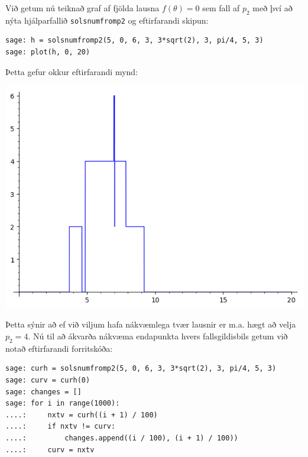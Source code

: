 \documentclass{article}
\begin{document}
\vspace*{0.5cm}

Við getum nú teiknað graf af fjölda lausna $f(\theta) = 0$ sem fall af $p_2$ með því að nýta hjálparfallið \verb|solsnumfromp2| og eftirfarandi skipun: \\

\begin{verbatim}
sage: h = solsnumfromp2(5, 0, 6, 3, 3*sqrt(2), 3, pi/4, 5, 3)
sage: plot(h, 0, 20)
\end{verbatim}

\vspace*{0.5cm}

Þetta gefur okkur eftirfarandi mynd: \\

\begin{center}
\includegraphics[scale=0.75]{lidur7plot}
\end{center}

\vspace*{0.5cm}

Þetta sýnir að ef við viljum hafa nákvæmlega tvær lausnir er m.a. hægt að velja $p_2 = 4$. Nú til að ákvarða nákvæma endapunkta hvers fallsgildisbils getum við notað eftirfarandi forritskóða: \\

\begin{verbatim}
sage: curh = solsnumfromp2(5, 0, 6, 3, 3*sqrt(2), 3, pi/4, 5, 3)
sage: curv = curh(0)
sage: changes = []
sage: for i in range(1000):
....:     nxtv = curh((i + 1) / 100)
....:     if nxtv != curv:
....:         changes.append((i / 100), (i + 1) / 100))
....:     curv = nxtv
\end{verbatim}
\end{document}
